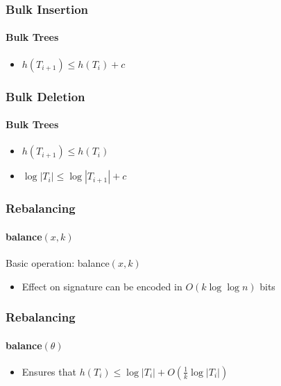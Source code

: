 \documentclass[xcolor=dvipsnames]{beamer}
\begin{document}
\begin{frame}
    \frametitle{Bulk Insertion}
    \framesubtitle{Bulk Trees}

    \begin{center}
    \end{center}
    \begin{itemize}
        \item<6> $h(T_{i+1})\le h(T_i)+c$
    \end{itemize}
\end{frame}

\begin{frame}
    \frametitle{Bulk Deletion}
    \framesubtitle{Bulk Trees}

    \begin{center}
    \end{center}
    \begin{itemize}
        \item<7-> $h(T_{i+1}) \le h(T_i)$
        \item<8-> $\log|T_i|\le \log|T_{i+1}| + c$
    \end{itemize}
\end{frame}


\begin{frame}
    \frametitle{Rebalancing}
    \framesubtitle{balance$(x,k)$}

    Basic operation: balance$(x,k)$
    \begin{center}
    \end{center}
    \begin{itemize}
        \item<5->Effect on signature can be encoded in $O(k\log\log n)$ bits
    \end{itemize}
\end{frame}

\begin{frame}
    \frametitle{Rebalancing}
    \framesubtitle{balance$(\theta)$}

    \begin{center}
    \end{center}
    \begin{itemize}
        \item<11->Ensures that $h(T_i)\le \log|T_i| + O(\tfrac{1}{k}\log|T_i|)$
    \end{itemize}
\end{frame}
\end{document}
